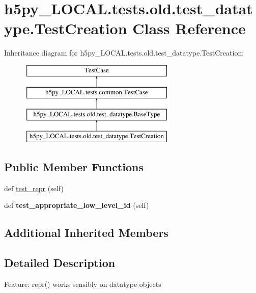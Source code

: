 \hypertarget{classh5py__LOCAL_1_1tests_1_1old_1_1test__datatype_1_1TestCreation}{}\section{h5py\+\_\+\+L\+O\+C\+A\+L.\+tests.\+old.\+test\+\_\+datatype.\+Test\+Creation Class Reference}
\label{classh5py__LOCAL_1_1tests_1_1old_1_1test__datatype_1_1TestCreation}
Inheritance diagram for h5py\+\_\+\+L\+O\+C\+A\+L.\+tests.\+old.\+test\+\_\+datatype.\+Test\+Creation\+:\begin{figure}[H]
\begin{center}
\leavevmode
\includegraphics[height=4.000000cm]{classh5py__LOCAL_1_1tests_1_1old_1_1test__datatype_1_1TestCreation}
\end{center}
\end{figure}
\subsection*{Public Member Functions}
\begin{DoxyCompactItemize}
\item 
def \hyperlink{classh5py__LOCAL_1_1tests_1_1old_1_1test__datatype_1_1TestCreation_ab9a3ce46ce248ebab53ad0014b7f9e06}{test\+\_\+repr} (self)
\item 
\mbox{\label{classh5py__LOCAL_1_1tests_1_1old_1_1test__datatype_1_1TestCreation_ae83694550666f2c8fd6c771fef875668}} 
def {\bfseries test\+\_\+appropriate\+\_\+low\+\_\+level\+\_\+id} (self)
\end{DoxyCompactItemize}
\subsection*{Additional Inherited Members}


\subsection{Detailed Description}
\begin{DoxyVerb}    Feature: repr() works sensibly on datatype objects
\end{DoxyVerb}
 

